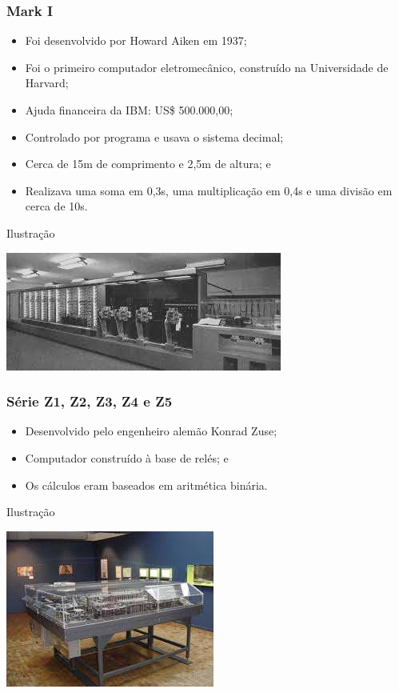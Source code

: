 \documentclass[aspectratio=169]{beamer} %
\begin{document}
\begin{frame}
	\frametitle{Mark I}
	
	\begin{itemize}
		\item Foi desenvolvido por Howard Aiken em 1937;
		\item Foi o primeiro computador eletromecânico, construído na Universidade de Harvard;
		\item Ajuda financeira da IBM: US\$ 500.000,00;
		\item Controlado por programa e usava o sistema decimal;
		\item Cerca de 15m de comprimento e 2,5m de altura; e
		\item Realizava uma soma em 0,3s, uma multiplicação em 0,4s e uma divisão em cerca de 10s.
	\end{itemize}\vfill
	
	\begin{exampleblock}{Ilustra\c cão}
		\begin{center}
			\includegraphics[scale=0.5]{img/marki}
		\end{center}
	\end{exampleblock}
\end{frame}

\begin{frame}
	\frametitle{Série Z1, Z2, Z3, Z4 e Z5}
	
	\begin{itemize}
		\item Desenvolvido pelo engenheiro alemão Konrad Zuse;
		\item  Computador construído à base de relés; e
		\item Os cálculos eram baseados em aritmética binária.
	\end{itemize}\vfill
	
	\begin{exampleblock}{Ilustra\c cão}
		\begin{center}
			\includegraphics[scale=0.5]{img/z1}
		\end{center}
	\end{exampleblock}
\end{frame}
\end{document}
